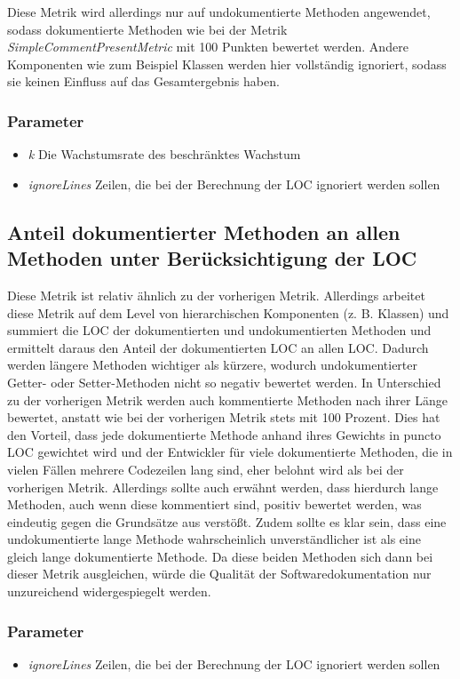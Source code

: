  Diese Metrik wird allerdings nur auf undokumentierte Methoden angewendet, sodass dokumentierte Methoden wie bei der Metrik \textit{SimpleCommentPresentMetric} mit 100 Punkten bewertet werden. Andere Komponenten wie zum Beispiel Klassen werden hier vollständig ignoriert, sodass sie keinen Einfluss auf das Gesamtergebnis haben.
 \subsubsection{Parameter}
 \begin{itemize}
     \item \textit{k} Die Wachstumsrate des beschränktes Wachstum
     \item \textit{ignoreLines} Zeilen, die bei der Berechnung der \ac{LOC} ignoriert werden sollen
 \end{itemize}
     

 \subsection{Anteil dokumentierter Methoden an allen Methoden unter Berücksichtigung der LOC}\label{chapter:metrics_loc_ratio}
Diese Metrik ist relativ ähnlich zu der vorherigen Metrik. Allerdings arbeitet diese Metrik auf dem Level von hierarchischen Komponenten (z. B. Klassen) und summiert die \ac{LOC} der dokumentierten und undokumentierten Methoden und ermittelt daraus den Anteil der dokumentierten \ac{LOC} an allen \ac{LOC}. Dadurch werden längere Methoden wichtiger als kürzere, wodurch undokumentierter Getter- oder Setter-Methoden nicht so negativ bewertet werden. In Unterschied zu der vorherigen Metrik werden auch kommentierte Methoden nach ihrer Länge bewertet, anstatt wie bei der vorherigen Metrik stets mit 100 Prozent. Dies hat den Vorteil, dass jede dokumentierte Methode anhand ihres Gewichts in puncto \ac{LOC} gewichtet wird und der Entwickler für viele dokumentierte Methoden, die in vielen Fällen mehrere Codezeilen lang sind, eher belohnt wird als bei der vorherigen Metrik. Allerdings sollte auch erwähnt werden, dass hierdurch lange Methoden, auch wenn diese kommentiert sind, positiv bewertet werden, was eindeutig gegen die Grundsätze aus \cite[S. 34]{martin2009clean} verstößt. Zudem sollte es klar sein, dass eine undokumentierte lange Methode wahrscheinlich unverständlicher ist als eine gleich lange dokumentierte Methode. Da diese beiden Methoden sich dann bei dieser Metrik ausgleichen, würde die Qualität der Softwaredokumentation nur unzureichend widergespiegelt werden.
  \subsubsection{Parameter}
  \begin{itemize}
     \item \textit{ignoreLines} Zeilen, die bei der Berechnung der \ac{LOC} ignoriert werden sollen
 \end{itemize}
 